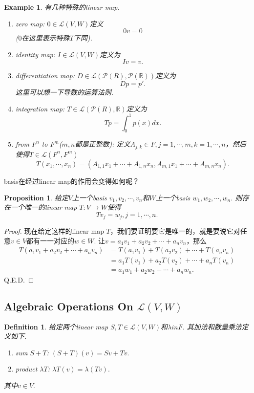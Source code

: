 \documentclass{article}
\newtheorem{proposition}[theorem]{Proposition}
\newtheorem{example}[theorem]{Example}
\newtheorem{definition}[theorem]{Definition}
\newcommand*{\xfunc}[4]{{#2}\colon{#3}{#1}{#4}}
\newcommand*{\func}[3]{\xfunc{\to}{#1}{#2}{#3}}
\begin{document}
\begin{example}
\rm 有几种特殊的linear map.
\begin{enumerate}
	\item zero map: $0 \in \mathcal{L}(V,W)$定义\[0v=0\]($0$在这里表示特殊$T$下同).
	\item identity map: $I \in \mathcal{L}(V,W)$定义为\[Iv=v.\]
	\item differentiation map: $D \in \mathcal{L}(\mathcal{P}({R}),\mathcal{P}(\mathbb{R}))$定义为\[Dp = p'.\] 这里可以想一下导数的运算法则.
	\item integration map: $T \in \mathcal{L}(\mathcal{P}({R}),\mathbb{R})$定义为\[Tp = \int_{0}^{1} p(x)dx.\]
	\item from $F^n$ to $F^m$($m,n$都是正整数): 定义$A_{j,k} \in F, j = 1,\cdots,m , k = 1,\cdots,n$，然后使得$T \in \mathcal{L}(F^n,F^m)$
	$$
		T(x_1,\cdots,x_n) = (A_{1,1}x_1+\cdots+A_{1,n}x_n,A_{m,1}x_1+\cdots+A_{m,n}x_n).
	$$
\end{enumerate}
\end{example}


{\color{red} basis在经过linear map的作用会变得如何呢}？

\begin{proposition}
\rm 给定$V$上一个basis $v_1,v_2,\cdots,v_n$和$W$上一个basis $w_1,w_2,\cdots,w_n$. 则存在一个唯一的linear map $\func{T}{V}{W}$使得
$$
	Tv_j = w_j, j = 1,\cdots,n.
$$
\end{proposition}

\begin{proof}
现在给定这样的linear map $T$，我们要证明要它是唯一的，就是要说它对任意$v \in V$都有一一对应的$w \in W$. 让$v = a_1v_1+a_2v_2+\cdots+a_nv_n$，那么
$$
\begin{aligned}
T(a_1v_1+a_2v_2+\cdots+a_nv_n) &= T(a_1v_1) + T(a_2v_2) + \cdots + T(a_nv_n)\\
 &= a_1T(v_1) + a_2T(v_2) + \cdots + a_nT(v_n)\\
 &= a_1w_1 + a_2w_2 + \cdots + a_nw_n.
\end{aligned}
$$
Q.E.D.
\end{proof}

\newpage
\subsection{Algebraic Operations On $\mathcal{L}(V,W)$}

\begin{definition}
\rm 给定两个linear map $S,T \in \mathcal{L}(V,W)$和$\lambda in F$. 其加法和数量乘法定义如下. 
\begin{enumerate}
	\item sum $S+T$: $(S+T)(v) = Sv+Tv.$
	\item product $\lambda T$: $\lambda T(v) = \lambda(Tv).$
\end{enumerate}
其中$v \in V.$
\end{definition}
\end{document}
